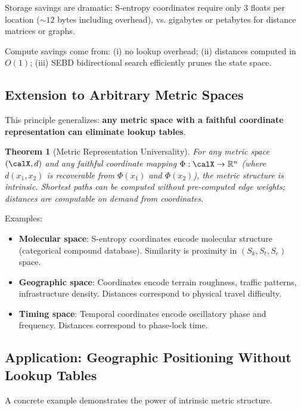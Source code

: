 \documentclass[twocolumn,11pt,a4paper]{article}
\newtheorem{theorem}{Theorem}[section]
\newcommand{\Sk}{S_k}
\newcommand{\St}{S_t}
\newcommand{\Se}{S_e}
\begin{document}
Storage savings are dramatic: S-entropy coordinates require only 3 floats per location ($\sim 12$ bytes including overhead), vs. gigabytes or petabytes for distance matrices or graphs.

Compute savings come from: (i) no lookup overhead; (ii) distances computed in $O(1)$; (iii) SEBD bidirectional search efficiently prunes the state space.

\subsection{Extension to Arbitrary Metric Spaces}

This principle generalizes: \textbf{any metric space with a faithful coordinate representation can eliminate lookup tables}.

\begin{theorem}[Metric Representation Universality]
For any metric space $(\calX, d)$ and any faithful coordinate mapping $\Phi: \calX \to \mathbb{R}^n$ (where $d(x_1, x_2)$ is recoverable from $\Phi(x_1)$ and $\Phi(x_2)$), the metric structure is intrinsic. Shortest paths can be computed without pre-computed edge weights; distances are computable on demand from coordinates.
\end{theorem}

Examples:
\begin{itemize}[nosep,leftmargin=1em]
  \item \textbf{Molecular space}: S-entropy coordinates encode molecular structure (categorical compound database). Similarity is proximity in $(\Sk, \St, \Se)$ space.
  \item \textbf{Geographic space}: Coordinates encode terrain roughness, traffic patterns, infrastructure density. Distances correspond to physical travel difficulty.
  \item \textbf{Timing space}: Temporal coordinates encode oscillatory phase and frequency. Distances correspond to phase-lock time.
\end{itemize}

\subsection{Application: Geographic Positioning Without Lookup Tables}

A concrete example demonstrates the power of intrinsic metric structure.
\end{document}
